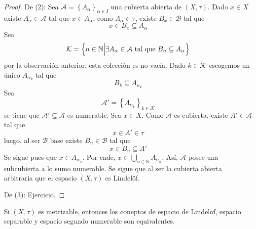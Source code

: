 \documentclass[12pt]{report}
\newcounter{it}
\theoremstyle{largebreak}
\begin{document}
\begin{proof}
        De (2): Sea $\mathcal{A}=\left\{A_\alpha\right\}_{ \alpha\in I}$ una cubierta abierta de $(X,\tau)$. Dado $x\in X$ existe $A_\alpha\in\mathcal{A}$ tal que $x\in A_\alpha$, como $A_\alpha\in\tau$, existe $B_x\in\mathcal{B}$ tal que
        \begin{equation*}
            x\in B_x\subseteq A_\alpha
        \end{equation*}
        Sea
        \begin{equation*}
            \mathcal{K}=\left\{n\in\mathbb{N}\Big|\exists A_\alpha\in\mathcal{A}\textup{ tal que }B_n\subseteq A_\alpha \right\}
        \end{equation*}
        por la observación anterior, esta colección es no vacía. Dado $k\in\mathcal{K}$ escogemos un único $A_{\alpha_k}$ tal que
        \begin{equation*}
            B_k\subseteq A_{\alpha_k}
        \end{equation*}
        Sea
        \begin{equation*}
            \mathcal{A}'=\left\{A_{\alpha_k} \right\}_{ k\in\mathcal{K}}
        \end{equation*}
        se tiene que $\mathcal{A}'\subseteq\mathcal{A}$ es numerable. Sea $x\in X$, Como $\mathcal{A}$ es cubierta, existe $A'\in\mathcal{A}$ tal que
        \begin{equation*}
            x\in A'\in\tau
        \end{equation*}
        luego, al ser $\mathcal{B}$ base existe $B_n\in\mathcal{B}$ tal que
        \begin{equation*}
            x\in B_n\subseteq A'
        \end{equation*}
        Se sigue pues que $x\in A_{ \alpha_n}$. Por ende, $x\in\bigcup_{ n\in\mathbb{N}}A_{\alpha_n}$. Así, $\mathcal{A}$ posee una subcubierta a lo sumo numerable. Se sigue que al ser la cubierta abierta arbitraria que el espacio $(X,\tau)$ es Lindelöf.

        De (3): Ejercicio.
    \end{proof}

    \begin{propo}
        Si $(X,\tau)$ es metrizable, entonces los coneptos de espacio de Lindelöf, espacio separable y espacio segundo numerable son equivalentes.
    \end{propo}
\end{document}
